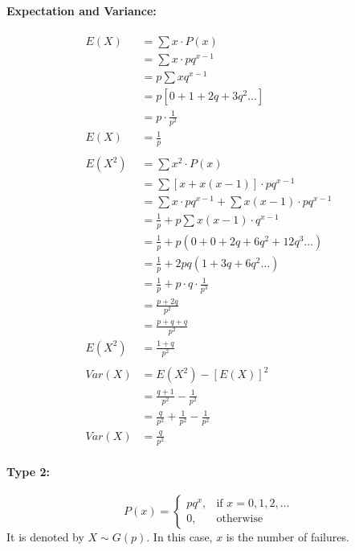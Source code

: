 \documentclass[
10pt, %
a4paper, %
]{report}
\begin{document}
\paragraph{Expectation and Variance:}
\begin{align*}
    E(X) &= \sum x \cdot P(x) \\
         &= \sum x \cdot pq^{x-1} \\
         &= p\sum x q^{x-1} \\
         &= p \left[ 0+1+2q+3q^2\dots \right] \\
         &= p \cdot \frac{1}{p^2} \\
    E(X) &= \frac{1}{p} \\ \\
    E(X^2) &= \sum x^2 \cdot P(x) \\
           &= \sum [x+x(x-1)] \cdot pq^{x-1} \\
           &= \sum x \cdot pq^{x-1} + \sum x(x-1) \cdot pq^{x-1} \\
           &= \frac{1}{p} + p\sum x(x-1) \cdot q^{x-1} \\
           &= \frac{1}{p} + p(0 + 0 + 2q + 6q^2 + 12q^3 \dots)\\
           &= \frac{1}{p} + 2pq(1+3q+6q^2 \dots) \\
           &= \frac{1}{p} + p\cdot q\cdot \frac{1}{p^3} \\
           &= \frac{p+2q}{p^2} \\
           &= \frac{p+q+q}{p^2} \\
    E(X^2) &= \frac{1+q}{p^2} \\ \\
    Var(X) &= E(X^2) - [E(X)]^2 \\
           &= \frac{q+1}{p^2} - \frac{1}{p^2} \\
           &= \frac{q}{p^2} + \frac{1}{p^2} - \frac{1}{p^2} \\
    Var(X) &= \frac{q}{p^2}
\end{align*}

\paragraph{Type 2:}
\[
    P(x)= 
\begin{cases}
    p q^x,    & \text{if } x = 0, 1, 2, \dots\\
    0,              & \text{otherwise}
\end{cases}
\]
It is denoted by \(X \sim G(p).\) In this case, \(x\) is the number of failures.\\
\end{document}
